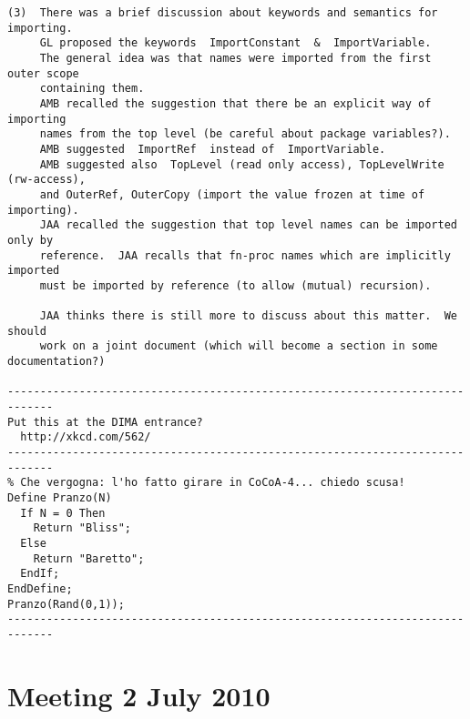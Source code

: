 \documentclass{book}[12,a4paper]
\begin{document}
\begin{verbatim}
(3)  There was a brief discussion about keywords and semantics for importing.
     GL proposed the keywords  ImportConstant  &  ImportVariable.
     The general idea was that names were imported from the first outer scope
     containing them.
     AMB recalled the suggestion that there be an explicit way of importing
     names from the top level (be careful about package variables?).
     AMB suggested  ImportRef  instead of  ImportVariable.
     AMB suggested also  TopLevel (read only access), TopLevelWrite (rw-access),
     and OuterRef, OuterCopy (import the value frozen at time of importing).
     JAA recalled the suggestion that top level names can be imported only by
     reference.  JAA recalls that fn-proc names which are implicitly imported
     must be imported by reference (to allow (mutual) recursion).

     JAA thinks there is still more to discuss about this matter.  We should
     work on a joint document (which will become a section in some documentation?)

-----------------------------------------------------------------------------
Put this at the DIMA entrance?
  http://xkcd.com/562/
-----------------------------------------------------------------------------
% Che vergogna: l'ho fatto girare in CoCoA-4... chiedo scusa!
Define Pranzo(N)
  If N = 0 Then
    Return "Bliss";
  Else
    Return "Baretto";
  EndIf;
EndDefine;
Pranzo(Rand(0,1));
-----------------------------------------------------------------------------
\end{verbatim}

\section{Meeting 2 July 2010}
\end{document}
